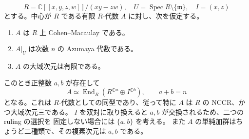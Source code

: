 \begin{proposition}
\label{cmo:prop:conifold-order}
\[
 R=\mathbb C[[x,y,z,w]]/(xy-zw),\quad
 U=\operatorname{Spec}R\setminus\{\mathfrak m\},\quad I=(x,z)
\]
とする。中心が $R$ である有限 $R$-代数 $A$ に対し、次を仮定する。
\begin{enumerate}
 \item $A$ は $R$ 上 Cohen--Macaulay である。
 \item $A|_U$ は次数 $n$ の Azumaya 代数である。
 \item $A$ の大域次元は有限である。
\end{enumerate}
このとき正整数 $a,b$ が存在して
\begin{equation}
 A\simeq \operatorname{End}_R(R^{\oplus a}\oplus I^{\oplus b}),\qquad a+b=n
 \label{cmo:eq:conifold-order}
\end{equation}
となる。これは $R$-代数としての同型であり、従って特に $A$ は $R$ の
NCCR、かつ大域次元三である。
$I$ を双対に取り換えると $a,b$ が交換されるため、二つの ruling の選択を
固定しない場合には $\{a,b\}$ を考える。
また $A$ の単純加群はちょうど二種類で、その複素次元は $a,b$ である。
\end{proposition}

